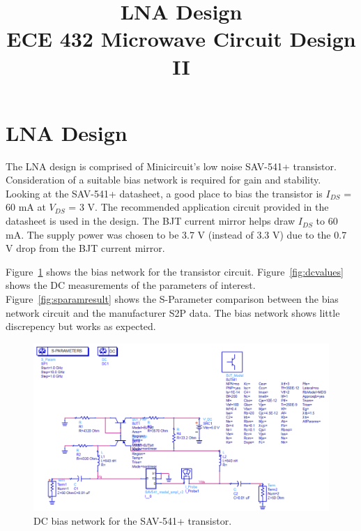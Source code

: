 \documentclass[conference]{IEEEtran}
\begin{document}
\title{LNA Design\\ECE 432 Microwave Circuit Design II}
\author{
}
\maketitle
\IEEEpeerreviewmaketitle
\section{LNA Design}
The LNA design is comprised of Minicircuit's low noise SAV-541+ transistor.  Consideration of a suitable bias network is required for gain and stability.  Looking at the SAV-541+ datasheet\cite{sav541datasheet}, a good place to bias the transistor is $I_{DS}$ = 60 mA at $V_{DS}$ = 3 V.  The recommended application circuit provided in the datasheet is used in the design.   The BJT current mirror helps draw $I_{DS}$ to 60 mA.  The supply power was chosen to be 3.7 V (instead of 3.3 V) due to the 0.7 V drop from the BJT current mirror.

Figure~\ref{fig:dccircuit} shows the bias network for the transistor circuit.  Figure~\ref{fig:dcvalues} shows the DC measurements of the parameters of interest.  Figure~\ref{fig:sparamresult} shows the S-Parameter comparison between the bias network circuit and the manufacturer S2P data.  The bias network shows little discrepency but works as expected.

\begin{figure}[!h]
\centering
\includegraphics[scale=0.29]{pics/DCBiasNetwork.png}
\caption{DC bias network for the SAV-541+ transistor.}
\label{fig:dccircuit}
\end{figure}
\end{document}
